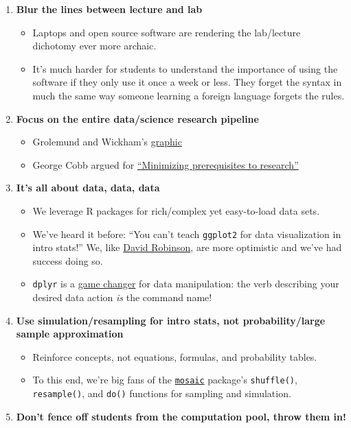 \documentclass[]{tufte-book}
\providecommand{\tightlist}{%
  \setlength{\itemsep}{0pt}\setlength{\parskip}{0pt}}
\begin{document}
\begin{enumerate}
\def\labelenumi{\arabic{enumi}.}
\tightlist
\item
  \textbf{Blur the lines between lecture and lab}

  \begin{itemize}
  \tightlist
  \item
    Laptops and open source software are rendering the lab/lecture
    dichotomy ever more archaic.
  \item
    It's much harder for students to understand the importance of using
    the software if they only use it once a week or less. They forget
    the syntax in much the same way someone learning a foreign language
    forgets the rules.
  \end{itemize}
\item
  \textbf{Focus on the entire data/science research pipeline}

  \begin{itemize}
  \tightlist
  \item
    Grolemund and Wickham's
    \href{http://r4ds.had.co.nz/introduction.html}{graphic}
  \item
    George Cobb argued for
    \href{https://arxiv.org/abs/1507.05346}{``Minimizing prerequisites
    to research''}
  \end{itemize}
\item
  \textbf{It's all about data, data, data}

  \begin{itemize}
  \tightlist
  \item
    We leverage R packages for rich/complex yet easy-to-load data sets.
  \item
    We've heard it before: ``You can't teach \texttt{ggplot2} for data
    visualization in intro stats!'' We, like
    \href{http://varianceexplained.org/r/teach_ggplot2_to_beginners/}{David
    Robinson}, are more optimistic and we've had success doing so.
  \item
    \texttt{dplyr} is a
    \href{http://chance.amstat.org/2015/04/setting-the-stage/}{game
    changer} for data manipulation: the verb describing your desired
    data action \emph{is} the command name!
  \end{itemize}
\item
  \textbf{Use simulation/resampling for intro stats, not
  probability/large sample approximation}

  \begin{itemize}
  \tightlist
  \item
    Reinforce concepts, not equations, formulas, and probability tables.
  \item
    To this end, we're big fans of the
    \href{https://github.com/ProjectMOSAIC/mosaic}{\texttt{mosaic}}
    package's \texttt{shuffle()}, \texttt{resample()}, and \texttt{do()}
    functions for sampling and simulation.
  \end{itemize}
\item
  \textbf{Don't fence off students from the computation pool, throw them
  in!}


\end{enumerate}
\end{document}
